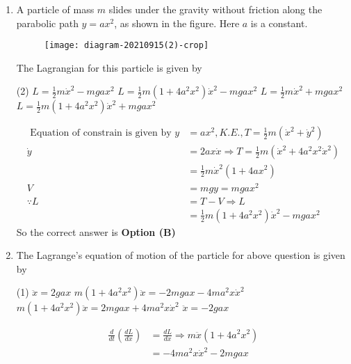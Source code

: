 \begin{enumerate}
	\item A particle of mass $m$ slides under the gravity without friction along the parabolic path $y=a x^{2}$, as shown in the figure. Here $a$ is a constant.\\
	\begin{figure}[H]
		\centering
		\texttt{[image: diagram-20210915(2)-crop]}
	\end{figure}
	The Lagrangian for this particle is given by
	{	}
	\begin{tasks}(2)
		\task[\textbf{A.}] $L=\frac{1}{2} m \dot{x}^{2}-m g a x^{2}$
		\task[\textbf{B.}] $L=\frac{1}{2} m\left(1+4 a^{2} x^{2}\right) \dot{x}^{2}-m g a x^{2}$
		\task[\textbf{C.}] $L=\frac{1}{2} m \dot{x}^{2}+m g a x^{2}$
		\task[\textbf{D.}] $L=\frac{1}{2} m\left(1+4 a^{2} x^{2}\right) \dot{x}^{2}+m g a x^{2}$
	\end{tasks}
\begin{answer}
	\begin{align*}
	\text{	Equation of constrain is given by }y&=a x^{2}, K.E., T=\frac{1}{2}m\left(\dot{x}^{2}+\dot{y}^{2}\right)\\
	\dot{y}&=2 a x \dot{x} \Rightarrow T=\frac{1}{2} m\left(\dot{x}^{2}+4 a^{2} x^{2} \dot{x}^{2}\right)\\&=\frac{1}{2} m \dot{x}^{2}\left(1+4 a x^{2}\right) \\
	V&=m g y=m g a x^{2}\\
	\because L&=T-V \Rightarrow L\\&=\frac{1}{2} m\left(1+4 a^{2} x^{2}\right) \dot{x}^{2}-m g a x^{2}
	\end{align*}
	So the correct answer is \textbf{Option (B)}
\end{answer}
	\item  The Lagrange's equation of motion of the particle for above question is given by
	{}
	\begin{tasks}(1)
		\task[\textbf{A.}] $\ddot{x}=2 g a x$
		\task[\textbf{B.}] $m\left(1+4 a^{2} x^{2}\right) \ddot{x}=-2 m g a x-4 m a^{2} x \dot{x}^{2}$
		\task[\textbf{C.}] $m\left(1+4 a^{2} x^{2}\right) \ddot{x}=2 m g a x+4 m a^{2} x \dot{x}^{2}$
		\task[\textbf{D.}] $\ddot{x}=-2 g a x$
	\end{tasks}
\begin{answer}
	\begin{align*}
	\frac{d}{d t}\left(\frac{d L}{d \dot{x}}\right)&=\frac{d L}{d x} \Rightarrow m \ddot{x}\left(1+4 a^{2} x^{2}\right)\\&=-4 m a^{2} x \dot{x}^{2}-2 m g a x

\end{align*}
\end{answer}
\end{enumerate}
